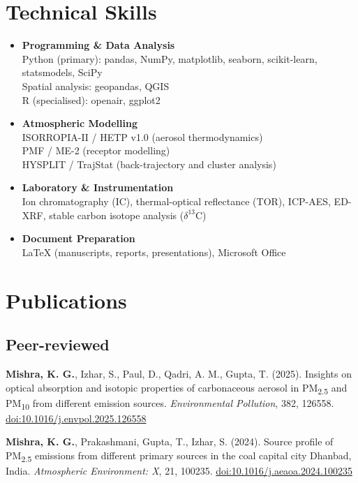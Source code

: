 \documentclass[11pt, a4paper]{article}
\begin{document}
\section*{Technical Skills}
\begin{itemize}[leftmargin=*]
    \item \textbf{Programming \& Data Analysis}\\
    Python (primary): pandas, NumPy, matplotlib, seaborn,
    scikit-learn, statsmodels, SciPy\\
    Spatial analysis: geopandas, QGIS \\
    R (specialised): openair, ggplot2

    \item \textbf{Atmospheric Modelling}\\
    ISORROPIA-II / HETP v1.0 (aerosol thermodynamics)\\
    PMF / ME-2 (receptor modelling)\\
    HYSPLIT / TrajStat (back-trajectory and cluster analysis)

    \item \textbf{Laboratory \& Instrumentation}\\
    Ion chromatography (IC), thermal-optical reflectance (TOR),
    ICP-AES, ED-XRF, stable carbon isotope analysis ($\delta^{13}$C)

    \item \textbf{Document Preparation}\\
    \LaTeX{} (manuscripts, reports, presentations), Microsoft Office
\end{itemize}

\section*{Publications}
\subsection*{Peer-reviewed}
\begin{enumerate}[leftmargin=*, label={[\arabic*]}]
  \item \textbf{Mishra, K. G.}, Izhar, S., Paul, D., Qadri, A. M., Gupta, T. (2025).
  Insights on optical absorption and isotopic properties of carbonaceous aerosol
  in PM\textsubscript{2.5} and PM\textsubscript{10} from different emission sources.
  \textit{Environmental Pollution}, 382, 126558.
  \href{https://doi.org/10.1016/j.envpol.2025.126558}{doi:10.1016/j.envpol.2025.126558}

  \item \textbf{Mishra, K. G.}, Prakashmani, Gupta, T., Izhar, S. (2024).
  Source profile of PM\textsubscript{2.5} emissions from different primary sources
  in the coal capital city Dhanbad, India.
  \textit{Atmospheric Environment: X}, 21, 100235.
  \href{https://doi.org/10.1016/j.aeaoa.2024.100235}{doi:10.1016/j.aeaoa.2024.100235}
\end{enumerate}
\end{document}
